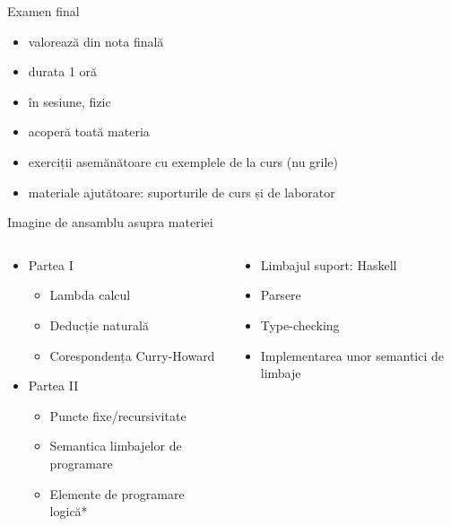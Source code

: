 \documentclass[xcolor=pdftex,romanian,colorlinks]{beamer}
\begin{document}
\begin{frame}{Examen final}
\begin{itemize}
	\item valorează  din nota finală
	\item durata 1 oră
	\item în sesiune, fizic
	\item acoperă toată materia
	\item exerciții asemănătoare cu exemplele de la curs (nu grile)
	\item materiale ajutătoare: suporturile de curs și de laborator
\end{itemize}
\end{frame}



\begin{frame}{Imagine de ansamblu asupra materiei}
 
\begin{columns}
\begin{column}{.5\textwidth}
\begin{itemize}
	\item \alert{Partea I}
	\begin{itemize}
		\item Lambda calcul
		\item Deducție naturală
		\item Corespondența Curry-Howard
	\end{itemize}
	\item \alert{Partea II}
	\begin{itemize}
		\item Puncte fixe/recursivitate
		\item Semantica limbajelor de programare
		\item Elemente de programare logică*
	\end{itemize}
\end{itemize}
\end{column}
\begin{column}{.5\textwidth}

\vspace{-2.2cm}
\begin{itemize}
		\item Limbajul suport: Haskell
		\item Parsere
		\item Type-checking 
		\item Implementarea unor semantici de limbaje
\end{itemize}
\end{column}
\end{columns}
\end{frame}
\end{document}
